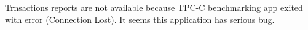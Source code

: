 \documentclass[../../main.tex]{subfiles}
\begin{document}
Trnsactions reports are not available because TPC-C benchmarking app exited with error (Connection Lost). It seems this application has serious bug.
\end{document}
